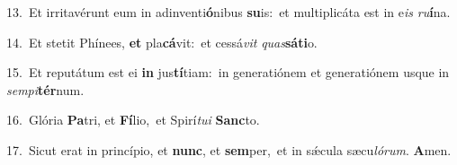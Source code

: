{\numbfont\textcolor{\numbcolor}{13.}}~Et irritavérunt eum in adinventi\-\textbf{ó}\-nibus \textbf{su}\-is:~\star et multiplicáta est in e\textit{is} \textit{ru}\-\textbf{í}na.\par
{\numbfont\textcolor{\numbcolor}{14.}}~Et stetit Phínees, \textbf{et} pla\-\textbf{cá}\-vit:~\star et cessá\textit{vit} \textit{quas}\-\textbf{sá}\textbf{ti}o.\par
{\numbfont\textcolor{\numbcolor}{15.}}~Et reputátum est ei \textbf{in} jus\-\textbf{tí}\-tiam:~\star in generatiónem et generatiónem usque in \textit{sem}\-\textit{pi}\textbf{tér}num.\par
{\numbfont\textcolor{\numbcolor}{16.}}~Glória \textbf{Pa}\-tri, et \textbf{Fí}\-lio,~\star et Spirí\-\textit{tu}\-\textit{i} \textbf{Sanc}\-to.\par
{\numbfont\textcolor{\numbcolor}{17.}}~Sicut erat in princípio, et \textbf{nunc}\-, et \textbf{sem}\-per,~\star et in sǽcula sæcu\-\textit{ló}\-\textit{rum}. \textbf{A}\-men.\par
